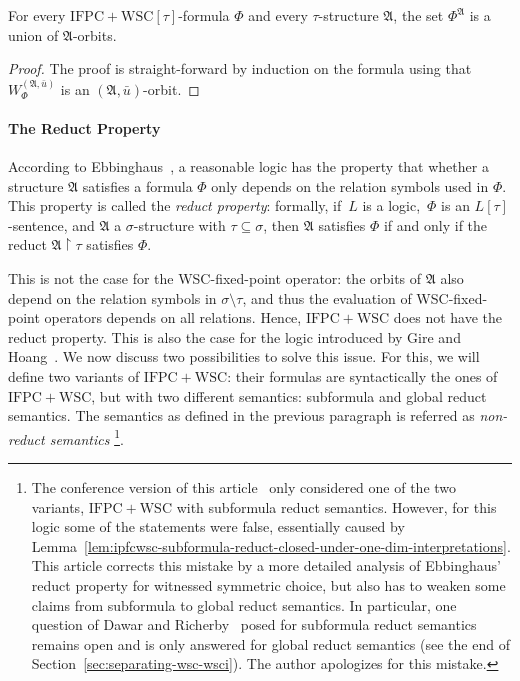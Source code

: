 \documentclass[]{lmcs}
\newcommand{\formA}{\Phi}
\newcommand{\tup}[1]{\bar{#1}}
\newcommand{\Struct}{\mathfrak{A}}
\newcommand{\vertA}{u}
\newcommand{\StructA}{\mathfrak{A}}
\newcommand{\reduct}[2]{#1 \upharpoonright #2}
\newcommand{\sig}{\tau}
\newcommand{\sigA}{\tau}
\newcommand{\sigB}{\sigma}
\newcommand{\IFPCWSC}{\ensuremath{\mathrm{IFPC{+}WSC}}}
\newcommand{\ifpcwscsig}[1]{\ensuremath{\mathrm{IFPC{+}WSC}[#1]}}
\begin{document}
\begin{lem}
	For every \ifpcwscsig{\sig}-formula $\formA$
	and every $\sig$-structure $\Struct$,
	the set $\formA^\Struct$ is
	a union of $\StructA$-orbits.
\end{lem}
\begin{proof}
	The proof is straight-forward by induction on the formula
	using that $W_\formA^{(\StructA,\tup{\vertA})}$ is an $(\StructA,\tup{\vertA})$-orbit.
\end{proof}


\newcommand{\IFPCWSCsub}{\ensuremath{%
			\mathrm{IFPC{+}WSC^{\mathrm{sub}\upharpoonright}}%
}}
\newcommand{\IFPCWSCglob}{\ensuremath{%
		\mathrm{IFPC{+}WSC^{\mathrm{glob}\upharpoonright}}%
}}
\newcommand{\IFPCWSCIglob}{\ensuremath{%
		\mathrm{IFPC{+}WSC^{\mathrm{glob}\upharpoonright}{+}I}%
}}
\newcommand{\ifpcwscsubsig}[1]{\ensuremath{\IFPCWSCsub{}[#1]}}
\paragraph{The Reduct Property}
According to Ebbinghaus~\cite{ebbinghaus1985}, a reasonable logic
has the property that whether a structure $\StructA$ satisfies a formula $\formA$
only depends on the relation symbols used in $\formA$.
This property is called the \emph{reduct property}:
formally, if~$L$ is a logic,~$\formA$ is an $L[\sigA]$-sentence, and $\StructA$ a $\sigB$-structure with $\sigA \subseteq \sigB$,
then $\StructA$ satisfies $\formA$ if and only if the reduct $\reduct{\StructA}{\sigA}$ satisfies $\formA$.

This is not the case for the WSC-fixed-point operator: the orbits of $\StructA$ also depend on the relation symbols in $\sigB\setminus \sigA$,
and thus the evaluation of WSC-fixed-point operators depends on all relations.
Hence, $\IFPCWSC$ does not have the reduct property.
This is also the case for the logic introduced by Gire and Hoang~\cite{GireHoang98}.
We now discuss two possibilities to solve this issue.
For this, we will define two variants of \IFPCWSC{}:
their formulas
are syntactically the ones of \IFPCWSC{}, but with two different semantics:
subformula and global reduct semantics.
The semantics as defined in the previous paragraph is referred as \emph{non-reduct semantics}%
\footnote{The conference version of this article~\cite{Lichter2023b} only considered one of the two variants, \IFPCWSC{} with subformula reduct semantics.
However, for this logic some of the statements were false, essentially caused by Lemma~\ref{lem:ipfcwsc-subformula-reduct-closed-under-one-dim-interpretations}.
This article corrects this mistake by a more detailed analysis of Ebbinghaus' reduct property for witnessed symmetric choice, but also has to weaken some claims from subformula to global reduct semantics.
In particular, one question of Dawar and Richerby~\cite{DawarRicherby03} posed for subformula reduct semantics remains open and is only answered for global reduct semantics (see the end of Section~\ref{sec:separating-wsc-wsci}).
The author apologizes for this mistake.
}.
\end{document}
